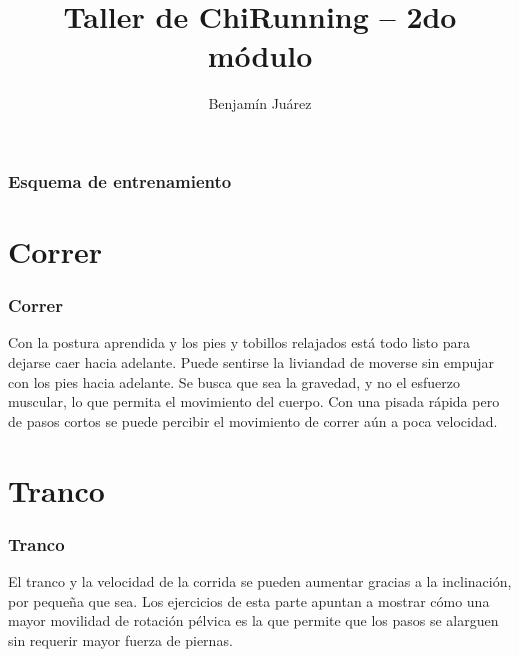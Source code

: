 \documentclass{beamer}
\title[Taller CR]{Taller de ChiRunning – 2do módulo} %
\author{Benjamín Juárez} %
\institute[Instructor certificado] %
{%
Instructor certificado de ChiRunning \\%
\medskip
\textit{cr.southamerica@gmail.com} %
}
\date{\the\year %
} %
\begin{document}
\begin{frame}
\titlepage %
\end{frame}

\begin{frame}
\frametitle{Esquema de entrenamiento} %
\tableofcontents %
\end{frame}


\section{Correr} 

\begin{frame}
\frametitle{Correr}
Con la postura aprendida y los pies y tobillos relajados está 
 todo listo para dejarse caer hacia adelante. Puede sentirse la
 liviandad de moverse sin empujar con los pies hacia adelante.
 Se busca que sea la gravedad, y no el esfuerzo muscular, lo
 que permita el movimiento del cuerpo. Con una pisada
 rápida pero de pasos cortos se puede percibir el movimiento
 de correr aún a poca velocidad.
\end{frame}

\section{Tranco}

\begin{frame}
\frametitle{Tranco}
El tranco y la velocidad de la corrida se pueden aumentar
 gracias a la inclinación, por pequeña que sea. Los ejercicios
 de esta parte apuntan a mostrar cómo una mayor movilidad
 de rotación pélvica es la que permite que los pasos se
 alarguen sin requerir mayor fuerza de piernas.
\end{frame}
\end{document}
